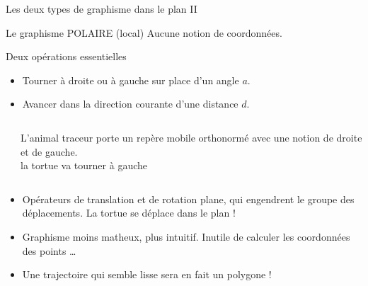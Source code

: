 \documentclass[10pt]{beamer}
\begin{document}
\begin{frame}{Les deux types de graphisme dans le plan II}

  \begin{alertblock}{Le graphisme POLAIRE (local)}
    Aucune notion de coordonnées.
  \end{alertblock}

  \begin{block}{Deux opérations essentielles}
    \begin{itemize}
    \item \alert{Tourner} à droite ou à gauche sur place d'un angle $a$.
    \item \alert{Avancer} dans la direction courante d'une distance $d$.
    \end{itemize}
  \end{block}

\begin{columns}[c]
  \begin{column}{0.48\textwidth}
  \end{column}
  \begin{column}{0.48\textwidth}
    L'animal traceur porte un repère mobile orthonormé avec une notion de droite et de gauche.
    \\ \alert{la tortue va tourner à gauche}
\end{column}
\end{columns}

\begin{itemize}
\item Opérateurs de translation et de rotation plane, qui engendrent le
groupe des déplacements. La tortue se déplace dans le plan !
\item Graphisme moins matheux, plus intuitif. Inutile de calculer les
coordonnées des points \dots
\item Une trajectoire qui semble lisse sera en fait un polygone !
\end{itemize}
\end{frame}
\end{document}
